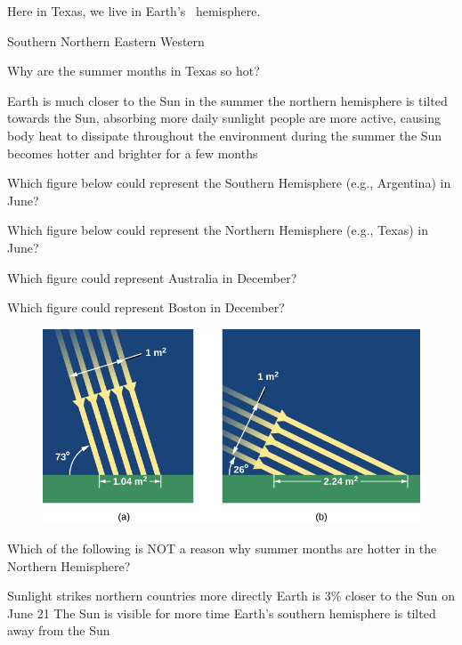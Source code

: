 \documentclass[addpoints]{exam}
\begin{document}
\begin{questions}
\question
Here in Texas, we live in Earth's \fillin\ hemisphere.

\begin{choices}
    \choice Southern
    \correctchoice Northern
    \choice Eastern
    \choice Western
\end{choices}

\question
Why are the summer months in Texas so hot?

\begin{choices}
    \choice Earth is much closer to the Sun in the summer
    \correctchoice the northern hemisphere is tilted towards the Sun, absorbing more daily sunlight
    \choice people are more active, causing body heat to dissipate throughout the environment
    \choice during the summer the Sun becomes hotter and brighter for a few months
\end{choices}

\question
Which figure below could represent the Southern Hemisphere (e.g., Argentina) in June?

\question 
Which figure below could represent the Northern Hemisphere (e.g., Texas) in June?

\question
Which figure could represent Australia in December?

\question
Which figure could represent Boston in December?

\begin{figure}[h!]
    \centering
    \includegraphics{Figures/Figure4.6.jpg}
\end{figure}

\clearpage

\question
Which of the following is NOT a reason why summer months are hotter in the Northern Hemisphere?

\begin{choices}
    \choice Sunlight strikes northern countries more directly
    \correctchoice Earth is 3\% closer to the Sun on June 21
    \choice The Sun is visible for more time
    \choice Earth's southern hemisphere is tilted away from the Sun
\end{choices}


\end{questions}
\end{document}

